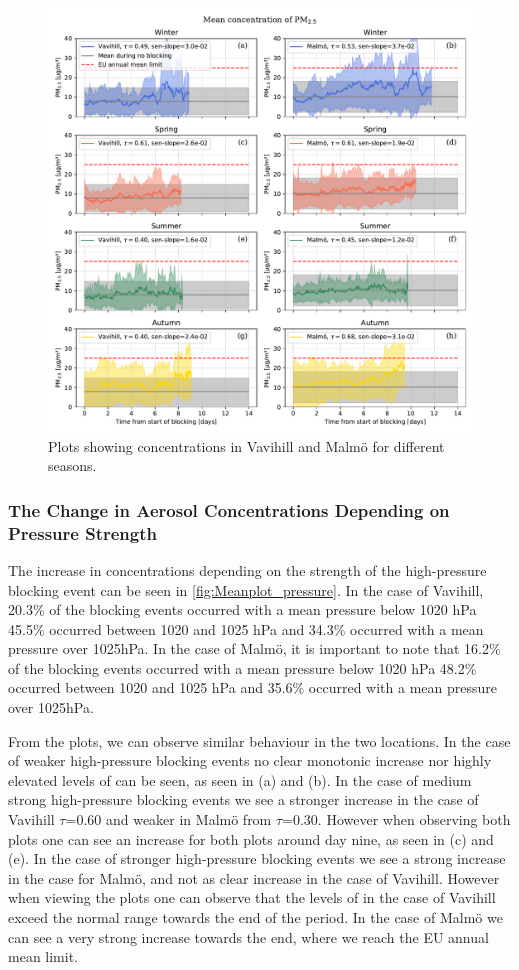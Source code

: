 \begin{figure}[H]
    \centering
    \includegraphics[width=\textwidth]{Figures/Meanplot_seasonal.pdf}
    \caption{Plots showing \PM concentrations in Vavihill and Malmö for different seasons. }
    \label{fig:Meanplot_seasonal}
\end{figure}
 

\subsubsection{The Change in Aerosol Concentrations Depending on Pressure Strength}
The increase in \PM  concentrations depending on the strength of the high-pressure blocking event can be seen in \autoref{fig:Meanplot_pressure}. In the case of Vavihill, 20.3\% of the blocking events occurred with a mean pressure below 1020 hPa 45.5\% occurred between 1020 and 1025 hPa and 34.3\% occurred with a mean pressure over 1025hPa. In the case of Malmö, it is important to note that 16.2\% of the blocking events occurred with a mean pressure below 1020 hPa 48.2\% occurred between 1020 and 1025 hPa and 35.6\% occurred with a mean pressure over 1025hPa.

From the plots, we can observe similar behaviour in the two locations. In the case of weaker high-pressure blocking events no clear monotonic increase nor highly elevated levels of \PM can be seen, as seen in (a) and (b). In the case of medium strong high-pressure blocking events we see a stronger increase in the case of Vavihill $\tau$=0.60 and weaker in Malmö from $\tau$=0.30. However when observing both plots one can see an increase for both plots around day nine, as seen in (c) and (e). In the case of stronger high-pressure blocking events we see a strong increase in the case for Malmö, and not as clear increase in the case of Vavihill. However when viewing the plots one can observe that the levels of \PM in the case of Vavihill exceed the normal range towards the end of the period. In the case of Malmö we can see a very strong increase towards the end, where we reach the EU annual mean limit. 

